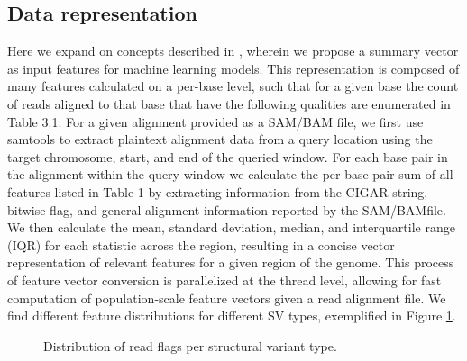 \subsection{Data representation}

Here we expand on concepts described in \cite{hillDeepLearningApproach2019}, wherein we propose a summary vector as input features for machine learning models. This representation is composed of many features calculated on a per-base level, such that for a given base the count of reads aligned to that base that have the following qualities are enumerated in Table 3.1. For a given alignment provided as a SAM/BAM file, we first use samtools \cite{danecekTwelveYearsSAMtools2021} to extract plaintext alignment data from a query location using the target chromosome, start, and end of the queried window. For each base pair in the alignment within the query window we calculate the per-base pair sum of all features listed in Table 1 by extracting information from the CIGAR string, bitwise flag, and general alignment information reported by the SAM/BAMfile. We then calculate the mean, standard deviation, median, and interquartile range (IQR) for each statistic across the region, resulting in a concise vector representation of relevant features for a given region of the genome. This process of feature vector conversion is parallelized at the thread level, allowing for fast computation of population-scale feature vectors given a read alignment file. We find different feature distributions for different SV types, exemplified in Figure \ref{fig:read-dists}.

\begin{figure}
    \centering
    \caption[Distribution of read flags per structural variant type.]{Distribution of read flags per structural variant type.}
    \label{fig:read-dists}
\end{figure}

